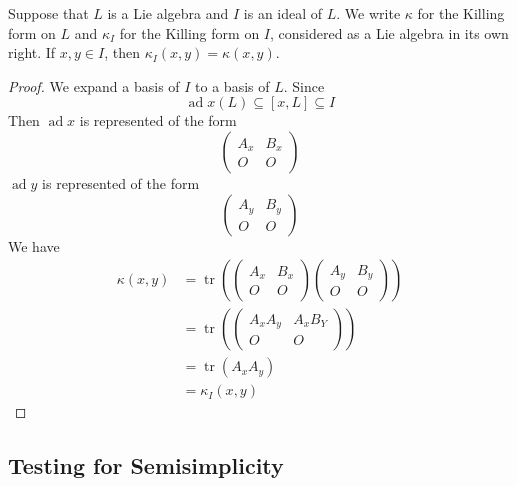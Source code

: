 \documentclass[../main.tex]{subfiles}
\begin{document}
\begin{lemma}{}{}
    Suppose that $L$ is a Lie algebra and $I$ is an ideal of $L$. We write $\kappa$ for the Killing form on $L$ and $\kappa_I$ for the Killing form on $I$, considered as a Lie algebra in its own right.
If $x, y \in I$, then $\kappa_I(x,y) = \kappa(x,y)$.
\end{lemma}{}{}

\begin{proof}
   We expand a basis of \(  I  \) to a basis of \(  L  \). Since \[
   \operatorname{ad}x\left( L\right)\subseteq \left[ x,L\right]\subseteq I  
   \] Then \(  \operatorname{ad}x  \) is represented of the form  \[
   \begin{pmatrix} 
       A_{x}&B_{x}\\ 
        O&O 
   \end{pmatrix} 
   \]  \(  \operatorname{ad}y  \) is represented of the form \[
   \begin{pmatrix} 
       A_{y}&B_{y}\\ 
        O& O
   \end{pmatrix} 
   \] We have \[
   \begin{aligned}
    \kappa \left( x,y \right)&=  \operatorname{tr} \left( \begin{pmatrix} 
        A_{x}&B_{x}\\ 
         O&O 
    \end{pmatrix}\begin{pmatrix} 
        A_{y}&B_{y}\\ 
         O&O 
    \end{pmatrix}   \right)   \\ 
     &= \operatorname{tr}\left( \begin{pmatrix} 
         A_{x}A_{y}&A_{x}B_{Y}\\ 
          O&O 
     \end{pmatrix}  \right) \\ 
      &= \operatorname{tr}\left( A_{x}A_{y} \right)\\ 
       &=  \kappa _{I}\left( x,y \right)  
   \end{aligned}
   \]

\end{proof}

\subsection{Testing for Semisimplicity}
\end{document}
